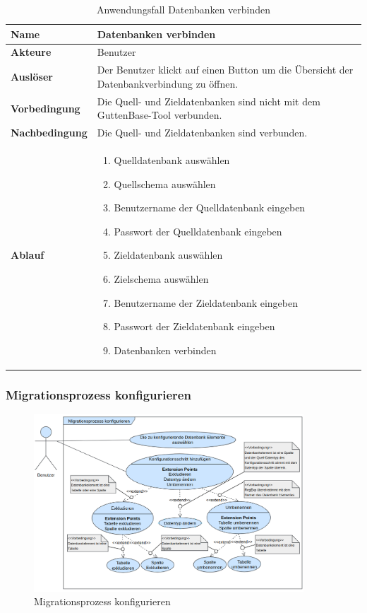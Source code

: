 \begin{table}[H]
	\centering
	\caption{Anwendungsfall Datenbanken verbinden}
	\begin{tabular}{ |p{4cm}|p{8cm}| }
		\hline
		\textbf{Name} & Datenbanken verbinden  \\
		\hline
		\textbf{Akteure} & Benutzer  \\
		\hline
		\textbf{Auslöser} & Der Benutzer klickt auf einen Button um die Übersicht der Datenbankverbindung zu öffnen. \\
		\hline
		\textbf{Vorbedingung} & Die Quell- und Zieldatenbanken sind nicht mit dem GuttenBase-Tool verbunden.\\
		\hline
		\textbf{Nachbedingung} & Die Quell- und Zieldatenbanken sind verbunden.  \\
		\hline
		\textbf{Ablauf} &  
		\begin{enumerate}
			\item Quelldatenbank auswählen
			\item Quellschema auswählen
			\item Benutzername der Quelldatenbank eingeben
			\item Passwort der Quelldatenbank eingeben
			\item Zieldatenbank auswählen
			\item Zielschema auswählen
			\item Benutzername der Zieldatenbank eingeben
			\item Passwort der Zieldatenbank eingeben
			\item Datenbanken verbinden
		\end{enumerate}  \\
		\hline
		
	\end{tabular}
	\label{table:db-verbinden}
\end{table}


\subsubsection*{Migrationsprozess konfigurieren}
\begin{figure}[H]
	\centering
	\includegraphics[width=0.9\textwidth]{images/af/af-mg-cfg}
	\caption{Migrationsprozess konfigurieren}
	\label{img:af-mg-cfg}
\end{figure}

